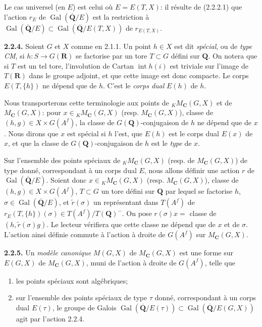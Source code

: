 \documentclass[10pt,a4paper]{article}
\begin{document}
Le cas universel (en \(E\)) est celui où \(E=E(T,X)\): il résulte de (2.2.2.1) que l'action \(r_E\) de \(\operatorname{Gal}(\overline{\mathbf Q}/E)\) est la restriction à \(\operatorname{Gal}(\overline{\mathbf Q}/E)\subset\operatorname{Gal}(\overline{\mathbf Q}/E(T,X))\) de \(r_{E(T,X)}\).

\textbf{2.2.4.} Soient \(G\) et \(X\) comme en 2.1.1. Un point \(h\in X\) est dit \emph{spécial}, ou de \emph{type CM}, si \(h:S\to G(\mathbf R)\) se factorise par un tore \(T\subset G\) défini sur \(\mathbf Q\). On notera que si \(T\) est un tel tore, l'involution de Cartan \(\operatorname{int}h(i)\) est triviale sur l'image de \(T(\mathbf R)\) dans le groupe adjoint, et que cette image est donc compacte. Le corps \(E(T,\{h\})\) ne dépend que de \(h\). C'est le \emph{corps dual} \(E(h)\) de \(h\).

Nous transporterons cette terminologie aux points de \({}_K M_{\mathbf C}(G,X)\) et de \(M_{\mathbf C}(G,X)\): pour \(x\in{}_K M_{\mathbf C}(G,X)\) (resp. \(M_{\mathbf C}(G,X)\)), classe de \((h,g)\in X\times G(A^f)\), la classe de \(G(\mathbf Q)\)-conjugaison de \(h\) ne dépend que de \(x\). Nous dirons que \(x\) est spécial si \(h\) l'est, que \(E(h)\) est le corps dual \(E(x)\) de \(x\), et que la classe de \(G(\mathbf Q)\)-conjugaison de \(h\) est le \emph{type} de \(x\).

Sur l'ensemble des points spéciaux de \({}_K M_{\mathbf C}(G,X)\) (resp. de \(M_{\mathbf C}(G,X)\)) de type donné, correspondant à un corps dual \(E\), nous allons définir une action \(r\) de \(\operatorname{Gal}(\overline{\mathbf Q}/E)\). Soient donc \(x\in{}_K M_{\mathbf C}(G,X)\) (resp. \(M_{\mathbf C}(G,X)\)), classe de \((h,g)\in X\times G(A^f)\), \(T\subset G\) un tore défini sur \(\mathbf Q\) par lequel se factorise \(h\), \(\sigma\in\operatorname{Gal}(\overline{\mathbf Q}/E)\), et \(\widetilde r(\sigma)\) un représentant dans \(T(A^f)\) de \(r_E(T,\{h\})(\sigma)\in T(A^f)/T(\mathbf Q)^{-}\). On pose \(r(\sigma)x=\) classe de \((h,\widetilde r(\sigma)g)\). Le lecteur vérifiera que cette classe ne dépend que de \(x\) et de \(\sigma\). L'action ainsi définie commute à l'action à droite de \(G(A^f)\) sur \(M_{\mathbf C}(G,X)\).

\textbf{2.2.5.} Un \emph{modèle canonique} \(M(G,X)\) de \(M_{\mathbf C}(G,X)\) est une forme sur \(E(G,X)\) de \(M_{\mathbf C}(G,X)\), muni de l'action à droite de \(G(A^f)\), telle que

\begin{enumerate}
\def\labelenumi{(\alph{enumi})}
\item
  les points spéciaux sont algébriques;
\item
  sur l'ensemble des points spéciaux de type \(\tau\) donné, correspondant à un corps dual \(E(\tau)\), le groupe de Galois \(\operatorname{Gal}(\overline{\mathbf Q}/E(\tau))\subset\operatorname{Gal}(\overline{\mathbf Q}/E(G,X))\) agit par l'action 2.2.4.
\end{enumerate}
\end{document}
